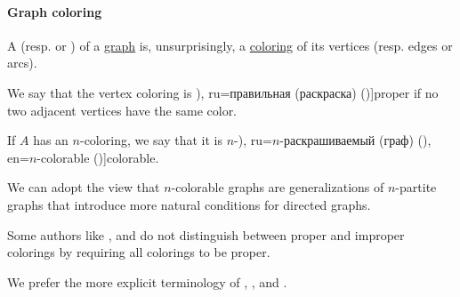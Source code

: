 \paragraph{Graph coloring}

\begin{definition}\label{def:graph_coloring}
  A  (resp.  or ) of a \hyperref[rem:arbitrary_graph]{graph} is, unsurprisingly, a \hyperref[def:set_coloring]{coloring} of its vertices (resp. edges or arcs).

  \begin{thmenum}
     We say that the vertex coloring is \term[bg=правилно (оцветяване) (\cite[141]{Мирчев2001}), ru=правильная (раскраска) (\cite[28]{Зыков2004})]{proper} if no two adjacent vertices have the same color.

     If \( A \) has an \( n \)-coloring, we say that it is \( n \)-\term[bg=\( n \)-оцветим (граф) (\cite[141]{Мирчев2001}), ru=\( n \)-раскрашиваемый (граф) (\cite[.1]{Новиков2013}), en=\( n \)-colorable (\cite[111]{Diestel2005})]{colorable}.

  \end{thmenum}
\end{definition}
\begin{comments}
  \item We can adopt the view that \( n \)-colorable graphs are generalizations of \( n \)-partite graphs that introduce more natural conditions for directed graphs.

  \item Some authors like ,  and  do not distinguish between proper and improper colorings by requiring all colorings to be proper.

  We prefer the more explicit terminology of , ,  and .
\end{comments}

